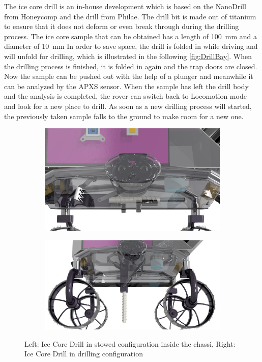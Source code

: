 The ice core drill is an in-house development which is based on the NanoDrill from Honeycomp and the drill from Philae. The drill bit is made out of titanium to ensure that it does not deform or even break through during the drilling process.
The ice core sample that can be obtained has a length of 100~mm and a diameter of 10~mm
In order to save space, the drill is folded in while driving and will unfold for drilling, which is illustrated in the following \autoref{fig:DrillBay}.
When the drilling process is finished, it is folded in again and the trap doors are closed.
Now the sample can be pushed out with the help of a plunger and meanwhile it can be analyzed by the APXS sensor. 
When the sample has left the drill body and the analysis is completed, the rover can switch back to Locomotion mode and look for a new place to drill. As soon as a new drilling process will started, the previously taken sample falls to the ground to make room for a new one.


\begin{figure}[htb]
     \centering
     \begin{subfigure}[b]{0.49\textwidth}
         \centering
         \includegraphics[width=\textwidth]{Media/DrillingBay3}
         \label{fig:stowedDrill}
     \end{subfigure}
     \hfill
     \begin{subfigure}[b]{0.49\textwidth}
         \centering
         \includegraphics[width=\textwidth]{Media/DrillingBay_unfolded2}
         \label{fig:drillconfig}
     \end{subfigure}
     \hfill
     \caption{Left: Ice Core Drill in stowed configuration inside the chassi, Right: Ice Core Drill in drilling configuration}
     \label{fig:DrillBay}
\end{figure}

